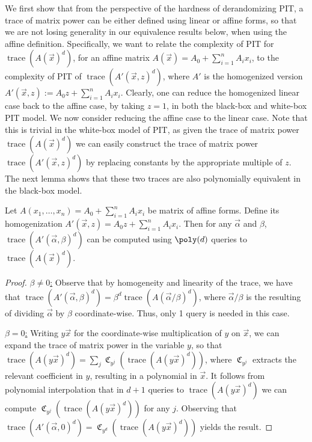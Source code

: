 \documentclass[letterpaper,11pt]{article}
\numberwithin{equation}{section}
\theoremstyle{plain}
\theoremstyle{remark}
\DeclareMathOperator{\tr}{trace}
\DeclareMathOperator{\coeffo}{\mathfrak{C}}
\newcommand{\coeff}[1]{\coeffo_{#1}}
\newcommand{\eqdef}{:=}
\begin{document}
We first show that from the perspective of the hardness of derandomizing PIT, a trace of matrix power can be either defined using linear or affine forms, so that we are not losing generality in our equivalence results below, when using the affine definition.  Specifically, we want to relate the complexity of PIT for $\tr(A(\vec{x})^d)$, for an affine matrix $A(\vec{x})=A_0+\sum_{i=1}^n A_ix_i$, to the complexity of PIT of $\tr(A'(\vec{x},z)^d)$, where $A'$ is the homogenized version $A'(\vec{x},z)\eqdef A_0z+\sum_{i=1}^n A_ix_i$.  Clearly, one can reduce the homogenized linear case back to the affine case, by taking $z=1$, in both the black-box and white-box PIT model.  We now consider reducing the affine case to the linear case.  Note that this is trivial in the white-box model of PIT, as given the trace of matrix power $\tr(A(\vec{x})^d)$ we can easily construct the trace of matrix power $\tr(A'(\vec{x},z)^d)$ by replacing constants by the appropriate multiple of $z$.  The next lemma shows that these two traces are also polynomially equivalent in the black-box model.

\begin{lemma}
	\label{linervsaffine}
	Let $A(x_1,\ldots,x_n)=A_0+\sum_{i=1}^n A_ix_i$ be matrix of affine forms.  Define its homogenization $A'(\vec{x},z)=A_0z+\sum_{i=1}^n A_ix_i$.  Then for any $\vec{\alpha}$ and $\beta$, $\tr(A'(\vec{\alpha},\beta)^d)$ can be computed using $\poly(d)$ queries to $\tr(A(\vec{x})^d)$.
\end{lemma}
\begin{proof}
	\underline{$\beta\ne 0$:}  Observe that by homogeneity and linearity of the trace, we have that $\tr(A'(\vec{\alpha},\beta)^d)=\beta^d\tr(A(\vec{\alpha}/\beta)^d)$, where $\vec{\alpha}/\beta$ is the resulting of dividing $\vec{\alpha}$ by $\beta$ coordinate-wise. Thus, only 1 query is needed in this case.

	\underline{$\beta=0$:}
	Writing $y\vec{x}$ for the coordinate-wise multiplication of $y$ on $\vec{x}$, we can expand the trace of matrix power in the variable $y$, so that $\tr(A(y\vec{x})^d)=\sum_j \coeff{y^j}(\tr(A(y\vec{x})^d))$, where $\coeff{y^j}$ extracts the relevant coefficient in $y$, resulting in a polynomial in $\vec{x}$.  It follows from polynomial interpolation that in $d+1$ queries to $\tr(A(y\vec{x})^d)$ we can compute $\coeff{y^j}(\tr(A(y\vec{x})^d))$ for any $j$. Observing that $\tr(A'(\vec{\alpha},0)^d)=\coeff{y^d}(\tr(A(y\vec{x})^d))$ yields the result.
\end{proof}
\end{document}

